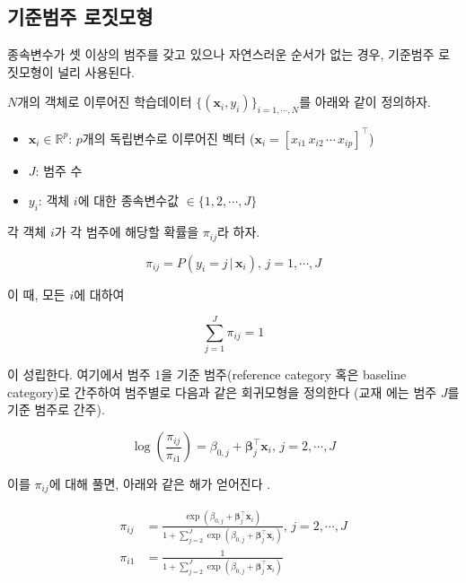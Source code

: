 \documentclass[
]{book}
\providecommand{\tightlist}{%
  \setlength{\itemsep}{0pt}\setlength{\parskip}{0pt}}
\begin{document}
\hypertarget{baseline-category-logit-model}{%
\subsection{기준범주 로짓모형}\label{baseline-category-logit-model}}

종속변수가 셋 이상의 범주를 갖고 있으나 자연스러운 순서가 없는 경우, 기준범주 로짓모형이 널리 사용된다.

\(N\)개의 객체로 이루어진 학습데이터 \(\{(\mathbf{x}_i, y_i)\}_{i = 1, \cdots, N}\)를 아래와 같이 정의하자.

\begin{itemize}
\tightlist
\item
  \(\mathbf{x}_i \in \mathbb{R}^p\): \(p\)개의 독립변수로 이루어진 벡터 (\(\mathbf{x}_i = [x_{i1} \, x_{i2} \, \cdots \, x_{ip}]^\top\))
\item
  \(J\): 범주 수
\item
  \(y_i\): 객체 \(i\)에 대한 종속변수값 \(\in \{1, 2, \cdots, J\}\)
\end{itemize}

각 객체 \(i\)가 각 범주에 해당할 확률을 \(\pi_{ij}\)라 하자.

\begin{equation*}
\pi_{ij} = P(y_i = j \, | \, \mathbf{x}_i), \, j = 1, \cdots, J
\end{equation*}

이 때, 모든 \(i\)에 대하여

\begin{equation*}
\sum_{j = 1}^{J} \pi_{ij} = 1
\end{equation*}

이 성립한다. 여기에서 범주 1을 기준 범주(reference category 혹은 baseline category)로 간주하여 범주별로 다음과 같은 회귀모형을 정의한다 (교재 \citep{jun2012datamining}에는 범주 \(J\)를 기준 범주로 간주).

\begin{equation*}
\log \left( \frac{\pi_{ij}}{\pi_{i1}} \right) = \beta_{0,j} + \boldsymbol\beta_{j}^\top \mathbf{x}_i, \, j = 2, \cdots, J
\end{equation*}

이를 \(\pi_{ij}\)에 대해 풀면, 아래와 같은 해가 얻어진다 \citep{czepiel2002maximum}.

\begin{equation}
\begin{split}
\pi_{ij} &= \frac{\exp \left( \beta_{0,j} + \boldsymbol\beta_{j}^\top \mathbf{x}_i \right)}{1 + \sum_{j = 2}^{J} \exp \left( \beta_{0,j} + \boldsymbol\beta_{j}^\top \mathbf{x}_i \right)}, \, j = 2, \cdots, J\\
\pi_{i1} &= \frac{1}{1 + \sum_{j = 2}^{J} \exp \left( \beta_{0,j} + \boldsymbol\beta_{j}^\top \mathbf{x}_i \right)}
\end{split}
\label{eq:multi-nominal-prob-sol}
\end{equation}
\end{document}
